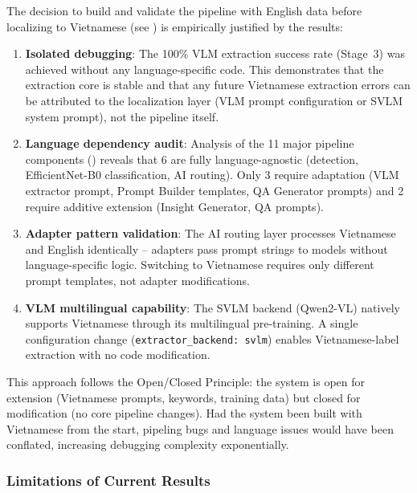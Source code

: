 The decision to build and validate the pipeline with English data before localizing to
Vietnamese (see ) is empirically justified by the results:

\begin{enumerate}
    \item \textbf{Isolated debugging}: The 100\% VLM extraction success rate (Stage~3)
          was achieved without any language-specific code. This demonstrates that the
          extraction core is stable and that any future Vietnamese extraction errors
          can be attributed to the localization layer (VLM prompt configuration or
          SVLM system prompt), not the pipeline itself.
    \item \textbf{Language dependency audit}: Analysis of the 11 major pipeline
          components () reveals that 6 are fully
          language-agnostic (detection, EfficientNet-B0 classification, AI routing).
          Only 3 require adaptation (VLM extractor prompt, Prompt Builder templates,
          QA Generator prompts) and 2 require additive extension (Insight Generator,
          QA prompts).
    \item \textbf{Adapter pattern validation}: The AI routing layer processes Vietnamese
          and English identically -- adapters pass prompt strings to models without
          language-specific logic. Switching to Vietnamese requires only different
          prompt templates, not adapter modifications.
    \item \textbf{VLM multilingual capability}: The SVLM backend (Qwen2-VL) natively
          supports Vietnamese through its multilingual pre-training. A single
          configuration change (\texttt{extractor\_backend: svlm}) enables
          Vietnamese-label extraction with no code modification.
\end{enumerate}

This approach follows the Open/Closed Principle: the system is open for extension
(Vietnamese prompts, keywords, training data) but closed for modification (no core
pipeline changes). Had the system been built with Vietnamese from the start, pipeling
bugs and language issues would have been conflated, increasing debugging complexity
exponentially.

\subsubsection{Limitations of Current Results}

